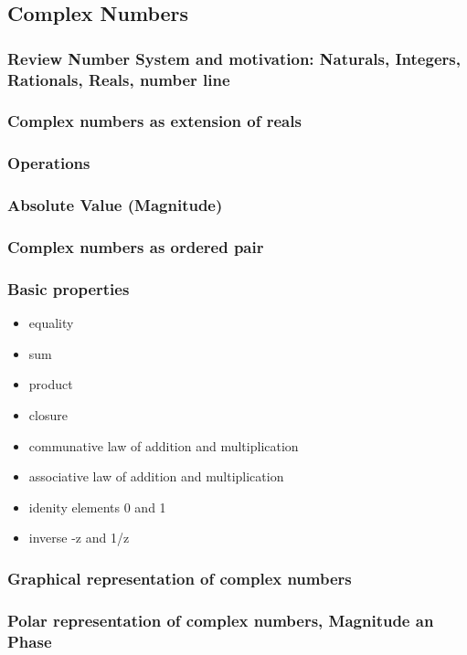 \documentclass{article}
\begin{document}
\subsection{Complex Numbers}
\label{sec:org65ee239}
\subsubsection{Review Number System and motivation: Naturals, Integers, Rationals, Reals, number line}
\label{sec:orgde38c88}
\subsubsection{Complex numbers as extension of reals}
\label{sec:org4fa22cd}
\subsubsection{Operations}
\label{sec:org6bf5f5d}
\subsubsection{Absolute Value (Magnitude)}
\label{sec:orgf38dd19}
\subsubsection{Complex numbers as ordered pair}
\label{sec:org5fd4f52}
\subsubsection{Basic properties}
\label{sec:orgdb7f100}
\begin{itemize}
\item equality
\item sum
\item product
\item closure
\item communative law of addition and multiplication
\item associative law of addition and multiplication
\item idenity elements 0 and 1
\item inverse -z and 1/z
\end{itemize}
\subsubsection{Graphical representation of complex numbers}
\label{sec:org1807cd6}
\subsubsection{Polar representation of complex numbers, Magnitude an Phase}
\label{sec:orgc1db3fd}
\end{document}
